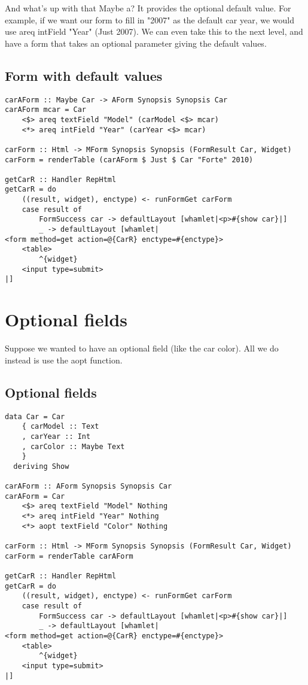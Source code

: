 And what's up with that Maybe a? It provides the optional default value. For example, if
we want our form to fill in "2007" as the default car year, we would use areq intField
"Year" (Just 2007). We can even take this to the next level, and have a form that takes an
optional parameter giving the default values.

\subsection{Form with default values}

\begin{lstlisting}
carAForm :: Maybe Car -> AForm Synopsis Synopsis Car
carAForm mcar = Car
    <$> areq textField "Model" (carModel <$> mcar)
    <*> areq intField "Year" (carYear <$> mcar)

carForm :: Html -> MForm Synopsis Synopsis (FormResult Car, Widget)
carForm = renderTable (carAForm $ Just $ Car "Forte" 2010)

getCarR :: Handler RepHtml
getCarR = do
    ((result, widget), enctype) <- runFormGet carForm
    case result of
        FormSuccess car -> defaultLayout [whamlet|<p>#{show car}|]
        _ -> defaultLayout [whamlet|
<form method=get action=@{CarR} enctype=#{enctype}>
    <table>
        ^{widget}
    <input type=submit>
|]
\end{lstlisting}

\section{Optional fields}

Suppose we wanted to have an optional field (like the car color). All we do instead is use
the aopt function.

\subsection{Optional fields}

\begin{lstlisting}
data Car = Car
    { carModel :: Text
    , carYear :: Int
    , carColor :: Maybe Text
    }
  deriving Show

carAForm :: AForm Synopsis Synopsis Car
carAForm = Car
    <$> areq textField "Model" Nothing
    <*> areq intField "Year" Nothing
    <*> aopt textField "Color" Nothing

carForm :: Html -> MForm Synopsis Synopsis (FormResult Car, Widget)
carForm = renderTable carAForm

getCarR :: Handler RepHtml
getCarR = do
    ((result, widget), enctype) <- runFormGet carForm
    case result of
        FormSuccess car -> defaultLayout [whamlet|<p>#{show car}|]
        _ -> defaultLayout [whamlet|
<form method=get action=@{CarR} enctype=#{enctype}>
    <table>
        ^{widget}
    <input type=submit>
|]
\end{lstlisting}

